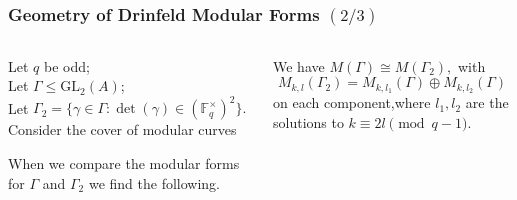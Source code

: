 \documentclass[handout]{beamer}
\numberwithin{equation}{section}
\numberwithin{case}{theorem}
\newcommand{\sX}{\mathscr{X}}		%
\newcommand{\bbF}{\mathbb{F}}		%
\newcommand{\GL}{\mathrm{GL}} 	%
\newcommand{\<}{\left\langle}
\renewcommand{\>}{\right\rangle}
\begin{document}
	\begin{frame}
		\frametitle{Geometry of Drinfeld Modular Forms $(2/3)$}
		\begin{columns} 
			\begin{column}{.5\textwidth}
				Let $q$ be odd;\\
				Let $\Gamma\leq \GL_2(A)$;\\ 
				Let $\Gamma_2=\{\gamma\in \Gamma:\det(\gamma)\in (\bbF_q^{\times})^2\}.$\\
				Consider the cover of modular curves\\
				\begin{figure}[!h]\centering
				\end{figure}\pause
				When we compare the modular forms for $\Gamma$ and $\Gamma_2$ we find the following.
			\end{column}\pause
			\begin{column}{.5\textwidth}
				\begin{theorem}
					We have $M(\Gamma)\cong M(\Gamma_2),$ \pause
					with \[M_{k,l}(\Gamma_2)=M_{k,l_1}(\Gamma)\oplus M_{k,l_2}(\Gamma)\] on each component,\pause where $l_1,l_2$ are the solutions to $k\equiv 2l\pmod{q-1}.$ 
				\end{theorem}
			\end{column}
		\end{columns}
	\end{frame}	
	
\end{document}
